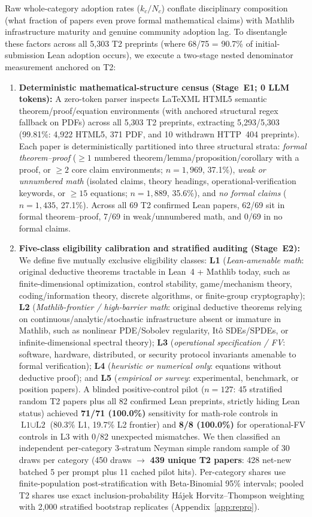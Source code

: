 \documentclass[11pt,letterpaper]{article}
\begin{document}
Raw whole-category adoption rates ($k_c / N_c$) conflate disciplinary composition (what fraction of papers even prove formal mathematical claims) with Mathlib infrastructure maturity and genuine community adoption lag. To disentangle these factors across all 5,303 T2 preprints (where 68/75 = 90.7\% of initial-submission Lean adoption occurs), we execute a two-stage nested denominator measurement anchored on T2:
\begin{enumerate}
  \item \textbf{Deterministic mathematical-structure census (Stage~E1; 0 LLM tokens):} A zero-token parser inspects LaTeXML HTML5 semantic theorem/proof/equation environments (with anchored structural regex fallback on PDFs) across all 5,303 T2 preprints, extracting 5,293/5,303 (99.81\%: 4,922 HTML5, 371 PDF, and 10 withdrawn HTTP~404 preprints). Each paper is deterministically partitioned into three structural strata: \emph{formal theorem--proof} ($\ge 1$ numbered theorem/lemma/proposition/corollary with a proof, or $\ge 2$ core claim environments; $n = 1{,}969$, 37.1\%), \emph{weak or unnumbered math} (isolated claims, theory headings, operational-verification keywords, or $\ge 15$ equations; $n = 1{,}889$, 35.6\%), and \emph{no formal claims} ($n = 1{,}435$, 27.1\%). Across all 69 T2 confirmed Lean papers, 62/69 sit in formal theorem--proof, 7/69 in weak/unnumbered math, and 0/69 in no formal claims.
  \item \textbf{Five-class eligibility calibration and stratified auditing (Stage~E2):} We define five mutually exclusive eligibility classes: \textbf{L1} (\emph{Lean-amenable math}: original deductive theorems tractable in Lean~4 + Mathlib today, such as finite-dimensional optimization, control stability, game/mechanism theory, coding/information theory, discrete algorithms, or finite-group cryptography); \textbf{L2} (\emph{Mathlib-frontier / high-barrier math}: original deductive theorems relying on continuous/analytic/stochastic infrastructure absent or immature in Mathlib, such as nonlinear PDE/Sobolev regularity, It\^o SDEs/SPDEs, or infinite-dimensional spectral theory); \textbf{L3} (\emph{operational specification / FV}: software, hardware, distributed, or security protocol invariants amenable to formal verification); \textbf{L4} (\emph{heuristic or numerical only}: equations without deductive proof); and \textbf{L5} (\emph{empirical or survey}: experimental, benchmark, or position papers). A blinded positive-control pilot ($n = 127$: 45 stratified random T2 papers plus all 82 confirmed Lean preprints, strictly hiding Lean status) achieved \textbf{71/71 (100.0\%)} sensitivity for math-role controls in $\text{L1} \cup \text{L2}$ (80.3\% L1, 19.7\% L2 frontier) and \textbf{8/8 (100.0\%)} for operational-FV controls in L3 with 0/82 unexpected mismatches. We then classified an independent per-category 3-stratum Neyman simple random sample of 30 draws per category (450 draws $\to$ \textbf{439 unique T2 papers}: 428 net-new batched 5 per prompt plus 11 cached pilot hits). Per-category shares use finite-population post-stratification with Beta-Binomial 95\% intervals; pooled T2 shares use exact inclusion-probability H\'ajek Horvitz--Thompson weighting with 2,000 stratified bootstrap replicates (Appendix~\ref{app:repro}).

\end{enumerate}
\end{document}
